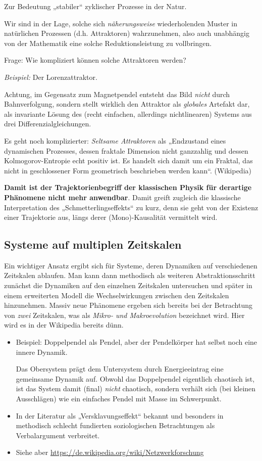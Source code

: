 \documentclass[11pt,a4paper]{article}
\begin{document}
Zur Bedeutung „stabiler“ zyklischer Prozesse in der Natur.

Wir sind in der Lage, solche sich \emph{näherungsweise} wiederholenden Muster
in natürlichen Prozessen (d.h. Attraktoren) wahrzunehmen, also auch unabhängig
von der Mathematik eine solche Reduktionsleistung zu vollbringen.

Frage: Wie kompliziert können solche Attraktoren werden?

\emph{Beispiel:} Der Lorenzattraktor.
  
Achtung, im Gegensatz zum Magnetpendel entsteht das Bild \emph{nicht} durch
Bahnverfolgung, sondern stellt wirklich den Attraktor als \emph{globales}
Artefakt dar, als invariante Lösung des (recht einfachen, allerdings
nichtlinearen) Systems aus drei Differenzialgleichungen.

Es geht noch komplizierter: \emph{Seltsame Attraktoren} als „Endzustand eines
dynamischen Prozesses, dessen fraktale Dimension nicht ganzzahlig und dessen
Kolmogorov-Entropie echt positiv ist. Es handelt sich damit um ein Fraktal,
das nicht in geschlossener Form geometrisch beschrieben werden kann“.
(Wikipedia)

\textbf{Damit ist der Trajektorienbegriff der klassischen Physik für derartige
  Phänomene nicht mehr anwendbar}. Damit greift zugleich die klassische
Interpretation des „Schmetterlingseffekts“ zu kurz, denn sie geht von der
Existenz einer Trajektorie aus, längs derer (Mono)-Kausalität vermittelt wird.

\subsection{Systeme auf multiplen Zeitskalen}

Ein wichtiger Ansatz ergibt sich für Systeme, deren Dynamiken auf
verschiedenen Zeitskalen ablaufen. Man kann dann methodisch als weiteren
Abstraktionsschritt zunächst die Dynamiken auf den einzelnen Zeitskalen
untersuchen und später in einem erweiterten Modell die Wechselwirkungen
zwischen den Zeitskalen hinzunehmen. Massiv neue Phänomene ergeben sich
bereits bei der Betrachtung von \emph{zwei} Zeitskalen, was als \emph{Mikro-
  und Makroevolution} bezeichnet wird. Hier wird es in der Wikipedia bereits
dünn.

\begin{itemize}[noitemsep]
\item Beispiel: Doppelpendel als Pendel, aber der Pendelkörper hat selbst noch
  eine innere Dynamik.

  Das Obersystem prägt dem Untersystem durch Energieeintrag eine gemeinsame
  Dynamik auf. Obwohl das Doppelpendel eigentlich chaotisch ist, ist das
  System damit (final) \emph{nicht} chaotisch, sondern verhält sich (bei
  kleinen Ausschlägen) wie ein einfaches Pendel mit Masse im Schwerpunkt.
\item In der Literatur als „Versklavungseffekt“ bekannt und besonders in
  methodisch schlecht fundierten soziologischen Betrachtungen als
  Verbalargument verbreitet.
\item Siehe aber \url{https://de.wikipedia.org/wiki/Netzwerkforschung}
\end{itemize}
\end{document}
